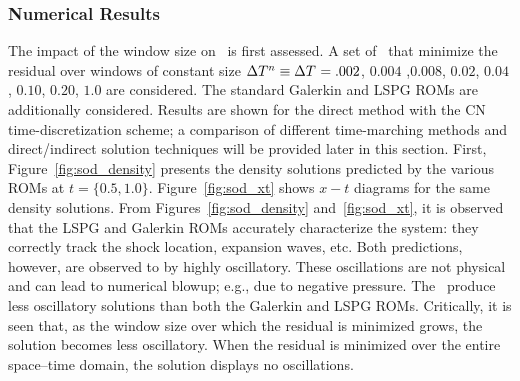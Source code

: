 %



\subsubsection{Numerical Results}
The impact of the window size on \methodAcronymROMs\ is first assessed. A set of \methodAcronymROMs\ that minimize the residual over windows of constant size 
$\Delta T^{n} \equiv \Delta T^{} =  .002$, $0.004$ ,$0.008$, $0.02$, $0.04$, $0.10$, $0.20$, $1.0$ are considered. The standard Galerkin and LSPG ROMs are additionally considered. Results are shown for the direct method with the CN time-discretization scheme; a comparison of different time-marching methods and direct/indirect solution techniques will be provided later in this section. 
First, Figure~\ref{fig:sod_density} presents the density solutions predicted by the various ROMs at $t = \{0.5,1.0\}$. Figure~\ref{fig:sod_xt} shows 
$x-t$ diagrams for the same density solutions. From Figures~\ref{fig:sod_density} and~\ref{fig:sod_xt}, it is observed that the LSPG and Galerkin ROMs accurately characterize 
the system: they correctly track the shock location, expansion waves, etc. Both predictions, however, are observed to by highly oscillatory. These oscillations are 
not physical and can lead to numerical blowup; e.g., due to negative pressure. The \methodAcronymROMs\ produce less oscillatory solutions than both 
the Galerkin and LSPG ROMs. Critically, it is seen that, as the window size over which the residual is minimized grows, the solution becomes less oscillatory. 
When the residual is minimized over the entire space--time domain, the solution displays no oscillations. 

